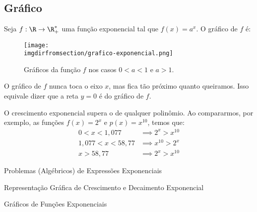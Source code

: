 \subsection{Gráfico}

\begin{example}
    Seja $f: \R \to \R_+^*$ uma função exponencial tal que $f(x) =
a^x$. O gráfico de $f$ é:

\begin{figure}[H]
    \centering
    \texttt{[image: \\imgdirfromsection/grafico-exponencial.png]}
    \caption{Gráficos da função $f$ nos casos $0<a<1$ e $a>1$.}
    \label{img:grafico-exponencial}
\end{figure}

O gráfico de $f$ nunca toca o eixo $x$, mas fica tão próximo quanto
queiramos. Isso equivale dizer que a reta $y=0$ é  do
gráfico de $f$.
\end{example}

\begin{example}
    O crescimento exponencial supera o de qualquer polinômio. Ao compararmos, por exemplo, as funções $f(x) = 2^x$ e $p(x)=x^{10}$, temos que:
    \begin{align*}
        0<x<1{,}077 & \implies  2^x > x^{10} \\
        1{,}077 < x < 58{,}77 & \implies  x^{10} > 2^x \\
        x>58{,}77 & \implies  2^x > x^{10}
    \end{align*}
\end{example}

\begin{onlineact}
    {Problemas (Algébricos) de Expressões Exponenciais}
\end{onlineact}

\begin{onlineact}
    {Representação Gráfica de Crescimento e Decaimento Exponencial}
\end{onlineact}

\begin{onlineact}
    {Gráficos de Funções Exponenciais}
\end{onlineact}